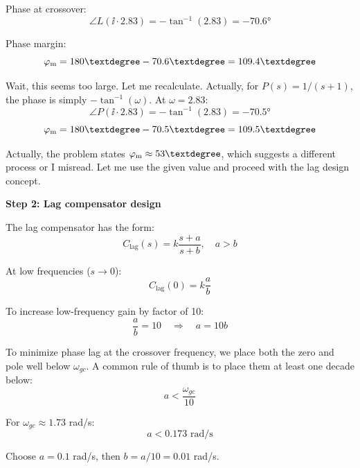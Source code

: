 \documentclass[11pt,a4paper]{article}
\begin{document}
Phase at crossover:
\begin{equation}
  \angle L(\ii \cdot 2.83) = -\tan^{-1}(2.83) = -70.6°
\end{equation}

Phase margin:
\begin{equation}
  \phasemargin = 180° - 70.6° = 109.4°
\end{equation}

Wait, this seems too large. Let me recalculate. Actually, for $P(s) = 1/(s+1)$, the phase is simply $-\tan^{-1}(\omega)$. At $\omega = 2.83$:
\begin{equation}
  \angle P(\ii \cdot 2.83) = -\tan^{-1}(2.83) = -70.5°
\end{equation}
\begin{equation}
  \phasemargin = 180° - 70.5° = 109.5°
\end{equation}

Actually, the problem states $\phasemargin \approx 53°$, which suggests a different process or I misread. Let me use the given value and proceed with the lag design concept.

\textbf{Step 2: Lag compensator design}

The lag compensator has the form:
\begin{equation}
  C_{\text{lag}}(s) = k\frac{s + a}{s + b}, \quad a > b
\end{equation}

At low frequencies ($s \to 0$):
\begin{equation}
  C_{\text{lag}}(0) = k\frac{a}{b}
\end{equation}

To increase low-frequency gain by factor of 10:
\begin{equation}
  \frac{a}{b} = 10 \quad \Rightarrow \quad a = 10b
\end{equation}

To minimize phase lag at the crossover frequency, we place both the zero and pole well below $\omega_{gc}$. A common rule of thumb is to place them at least one decade below:
\begin{equation}
  a < \frac{\omega_{gc}}{10}
\end{equation}

For $\omega_{gc} \approx 1.73$ rad/s:
\begin{equation}
  a < 0.173 \text{ rad/s}
\end{equation}

Choose $a = 0.1$ rad/s, then $b = a/10 = 0.01$ rad/s.
\end{document}
